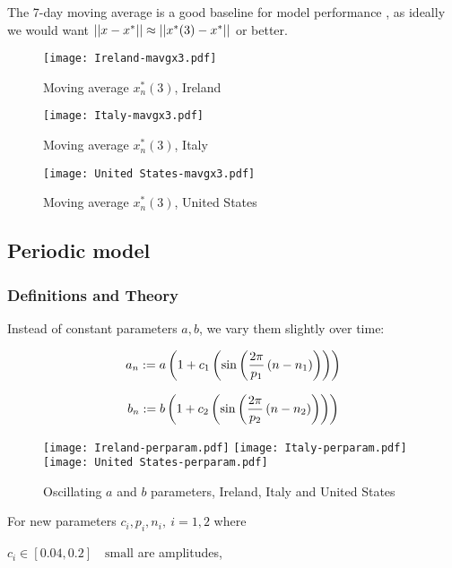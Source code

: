 The 7-day moving average is a good baseline for model performance , as ideally we would want $\left|\left|x-x^*\right|\right|\approx\left|\left|x^*(3)-x^*\right|\right|$ or better.

\begin{figure}[H]
\texttt{[image: Ireland-mavgx3.pdf]}
\caption{Moving average $x^*_n (3)$, Ireland}
\endminipage 
{}
\texttt{[image: Italy-mavgx3.pdf]}
\caption{Moving average $x^*_n (3)$, Italy}
\endminipage 
{}
\texttt{[image: United States-mavgx3.pdf]}
\caption{Moving average $x^*_n (3)$, United States}
\endminipage 
\end{figure}

\subsection{Periodic model}

\subsubsection{Definitions and Theory}

Instead of constant parameters $a,b$, we vary them slightly over time:

\begin{equation} \label{eq:anper}
a_n := a\left(1+c_1\left(\sin\left(\frac{2\pi}{p_1}\left(n-n_1\right)\right)\right)\right)
\end{equation}

\begin{equation} \label{eq:bnper}
b_n := b\left(1+c_2\left(\sin\left(\frac{2\pi}{p_2}\left(n-n_2\right)\right)\right)\right)
\end{equation}

\begin{figure}[H]
  \texttt{[image: Ireland-perparam.pdf]} \label{fig:ireland-perparam}
\endminipage\hfill
{}
  \texttt{[image: Italy-perparam.pdf]} \label{fig:italy-perparam}
\endminipage\hfill
{}
  \texttt{[image: United States-perparam.pdf]} \label{fig:usa-perparam}
\endminipage\hfill
\caption{Oscillating $a$ and $b$ parameters, Ireland, Italy and United States}
\end{figure}

For new parameters $c_i,p_i,n_i, \ i=1,2$ where

$c_i  \in [0.04, 0.2] \quad \text{small}$ are amplitudes,

